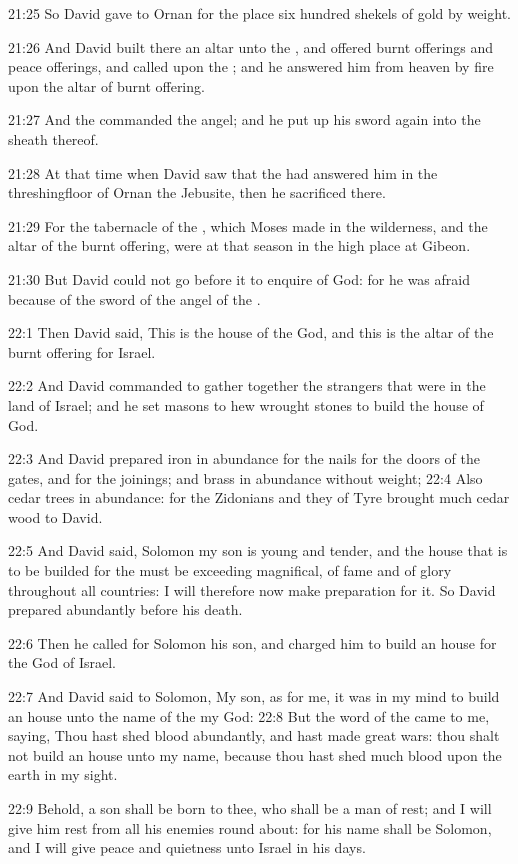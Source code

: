 21:25 So David gave to Ornan for the place six hundred shekels of gold
by weight.

21:26 And David built there an altar unto the \LORD, and offered burnt
offerings and peace offerings, and called upon the \LORD; and he
answered him from heaven by fire upon the altar of burnt offering.

21:27 And the \LORD commanded the angel; and he put up his sword again
into the sheath thereof.

21:28 At that time when David saw that the \LORD had answered him in
the threshingfloor of Ornan the Jebusite, then he sacrificed there.

21:29 For the tabernacle of the \LORD, which Moses made in the
wilderness, and the altar of the burnt offering, were at that season
in the high place at Gibeon.

21:30 But David could not go before it to enquire of God: for he was
afraid because of the sword of the angel of the \LORD.

22:1 Then David said, This is the house of the \LORD God, and this is
the altar of the burnt offering for Israel.

22:2 And David commanded to gather together the strangers that were in
the land of Israel; and he set masons to hew wrought stones to build
the house of God.

22:3 And David prepared iron in abundance for the nails for the doors
of the gates, and for the joinings; and brass in abundance without
weight; 22:4 Also cedar trees in abundance: for the Zidonians and they
of Tyre brought much cedar wood to David.

22:5 And David said, Solomon my son is young and tender, and the house
that is to be builded for the \LORD must be exceeding magnifical, of
fame and of glory throughout all countries: I will therefore now make
preparation for it. So David prepared abundantly before his death.

22:6 Then he called for Solomon his son, and charged him to build an
house for the \LORD God of Israel.

22:7 And David said to Solomon, My son, as for me, it was in my mind
to build an house unto the name of the \LORD my God: 22:8 But the word
of the \LORD came to me, saying, Thou hast shed blood abundantly, and
hast made great wars: thou shalt not build an house unto my name,
because thou hast shed much blood upon the earth in my sight.

22:9 Behold, a son shall be born to thee, who shall be a man of rest;
and I will give him rest from all his enemies round about: for his
name shall be Solomon, and I will give peace and quietness unto Israel
in his days.

